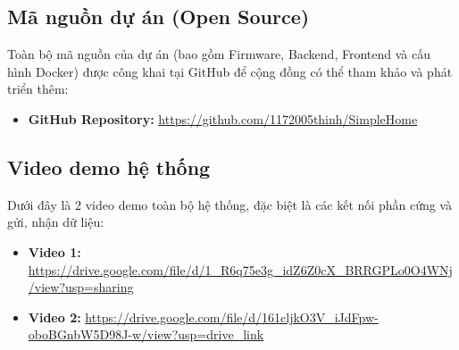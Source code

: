 \subsection*{Mã nguồn dự án (Open Source)}
Toàn bộ mã nguồn của dự án (bao gồm Firmware, Backend, Frontend và cấu hình Docker) được công khai tại GitHub để cộng đồng có thể tham khảo và phát triển thêm:
\begin{itemize}
    \item \textbf{GitHub Repository:} \href{https://github.com/1172005thinh/SimpleHome}{https://github.com/1172005thinh/SimpleHome}
\end{itemize}

\subsection*{Video demo hệ thống}
Dưới đây là 2 video demo toàn bộ hệ thống, đặc biệt là các kết nối phần cứng và gửi, nhận dữ liệu:

\begin{itemize}
    \item \textbf{Video 1:} \url{https://drive.google.com/file/d/1_R6q75e3g_idZ6Z0cX_BRRGPLo0O4WNj/view?usp=sharing}
    \item \textbf{Video 2:} \url{https://drive.google.com/file/d/161cljkO3V_iJdFpw-oboBGnbW5D98J-w/view?usp=drive_link}
\end{itemize}
